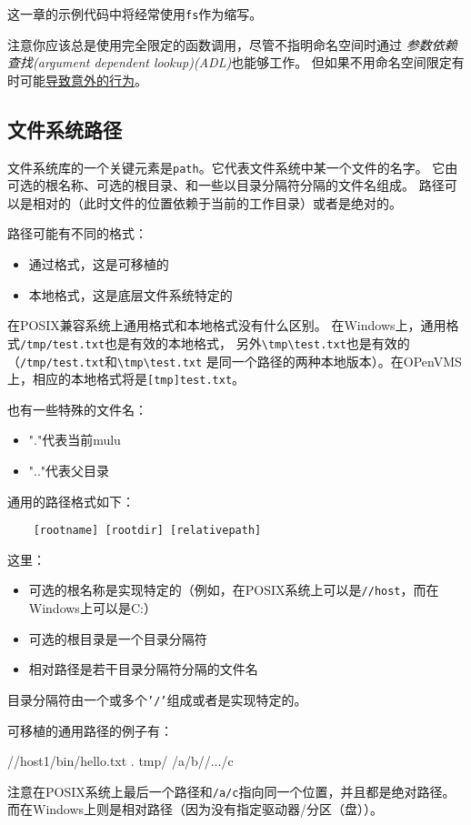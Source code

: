 这一章的示例代码中将经常使用\texttt{fs}作为缩写。

注意你应该总是使用完全限定的函数调用，尽管不指明命名空间时通过
\emph{参数依赖查找(argument dependent lookup)(ADL)}也能够工作。
但如果不用命名空间限定有时可能\hyperref[ADL导致意外行为]{导致意外的行为}。

\subsection{文件系统路径}\label{ch20.2.3}
文件系统库的一个关键元素是\texttt{path}。它代表文件系统中某一个文件的名字。
它由可选的根名称、可选的根目录、和一些以目录分隔符分隔的文件名组成。
路径可以是相对的（此时文件的位置依赖于当前的工作目录）或者是绝对的。

路径可能有不同的格式：
\begin{itemize}
    \item 通过格式，这是可移植的
    \item 本地格式，这是底层文件系统特定的
\end{itemize}
在POSIX兼容系统上通用格式和本地格式没有什么区别。
在Windows上，通用格式\texttt{/tmp/test.txt}也是有效的本地格式，
另外\texttt{\textbackslash tmp\textbackslash test.txt}也是有效的
（\texttt{/tmp/test.txt}和\texttt{\textbackslash tmp\textbackslash test.txt}
是同一个路径的两种本地版本）。在OPenVMS上，相应的本地格式将是\texttt{[tmp]test.txt}。

也有一些特殊的文件名：
\begin{itemize}
    \item "."代表当前mulu
    \item ".."代表父目录
\end{itemize}
通用的路径格式如下：
\begin{lstlisting}
    [rootname] [rootdir] [relativepath]
\end{lstlisting}
这里：
\begin{itemize}
    \item 可选的根名称是实现特定的（例如，在POSIX系统上可以是\texttt{//host}，而在Windows上可以是C:）
    \item 可选的根目录是一个目录分隔符
    \item 相对路径是若干目录分隔符分隔的文件名
\end{itemize}
目录分隔符由一个或多个\texttt{'/'}组成或者是实现特定的。

可移植的通用路径的例子有：
\begin{blacklisting}
    //host1/bin/hello.txt
    .
    tmp/
    /a/b//.../c
\end{blacklisting}
注意在POSIX系统上最后一个路径和\texttt{/a/c}指向同一个位置，并且都是绝对路径。
而在Windows上则是相对路径（因为没有指定驱动器/分区（盘））。

